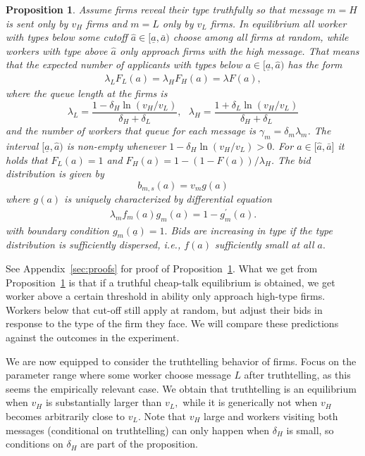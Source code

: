 \documentclass[12pt]{article}
\newtheorem{proposition}[theorem]{Proposition}
\begin{document}
\begin{proposition} \label{workers}
  Assume firms reveal their type truthfully so that message $m=H$ is sent only by $v_{H}$ firms and $m=L$ only by $v_{L}$ firms.
  In equilibrium all worker with types below some cutoff $\hat{a}\in \lbrack \underline{a},\bar{a})$ choose among all firms at random, while workers with type above $\hat{a}$ only approach firms with the high message.
  That means that the expected number of applicants with types below $a\in \lbrack \underline{a},\hat{a})$ has the form%
\begin{align*}
\lambda _{L}F_{L}(a)=\lambda _{H}F_{H}(a)=\lambda F(a),
\end{align*}
where the queue length at the firms is%
\begin{equation}
\lambda _{L}=\frac{1-\delta _{H}\ln (v_{H}/v_{L})}{\delta _{H}+\delta _{L}},%
\text{ }\lambda _{H}=\frac{1+\delta _{L}\ln (v_{H}/v_{L})}{\delta
_{H}+\delta _{L}}  \label{queue-length-separating}
\end{equation}%
and the number of workers that queue for each message is $\gamma _{m}=\delta_{m}\lambda _{m}$.
The interval $[\underline{a},\hat{a})$ is non-empty whenever $1-\delta _{H}\ln (v_{H}/v_{L})>0.$
  For $a\in \lbrack \hat{a},\bar{a}]$ it holds that $F_{L}(a)=1$ and $F_{H}(a)=1-(1-F(a))/\lambda _{H}$.
The bid distribution is given by 
\begin{equation}
b_{m,s}(a)=v_{m}g(a)  \label{bid}
\end{equation}%
where $g(a)$ is uniquely characterized by differential equation%
\begin{align*}
\lambda _{m}f_{m}(a)g_{m}(a)=1-g_{m}^{\prime }(a).
\end{align*}
with boundary condition $g_{m}(\underline{a})=1.$
Bids are increasing in type if the type distribution is sufficiently dispersed, i.e., $f(a)$ sufficiently small at all $a.$
\end{proposition}

See Appendix~\ref{sec:proofs} for proof of Proposition~\ref{workers}. 
What we get from Proposition~\ref{workers} is that if a truthful cheap-talk equilibrium is obtained, we get worker above a certain threshold in ability only approach high-type firms.
Workers below that cut-off still apply at random, but adjust their bids in response to the type of the firm they face.
We will compare these predictions against the outcomes in the experiment. 

We are now equipped to consider the truthtelling behavior of firms.
Focus on the parameter range where some worker choose message $L$ after truthtelling, as this seems the empirically relevant case.
We obtain that truthtelling is an equilibrium when $v_{H}$ is substantially larger than $v_{L},$ while it is generically not when $v_{H}$ becomes arbitrarily close to $v_{L}.$
Note that $v_{H}$ large and workers visiting both messages (conditional on truthtelling) can only happen when $\delta _{H}$ is small, so conditions on $\delta _{H}$ are part of the proposition.
\end{document}
